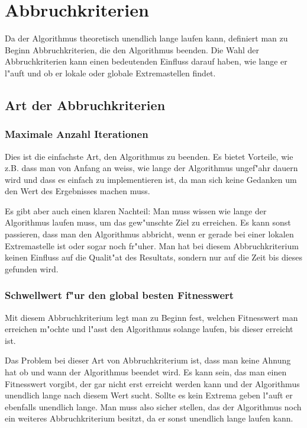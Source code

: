 \section{Abbruchkriterien}

Da der Algorithmus theoretisch unendlich lange laufen kann, definiert
man zu Beginn Abbruchkriterien, die den Algorithmus beenden.
Die Wahl der Abbruchkriterien kann einen bedeutenden Einfluss darauf
haben, wie lange er l"auft und ob er lokale oder globale Extremastellen
findet.

\subsection{Art der Abbruchkriterien}

\subsubsection{Maximale Anzahl Iterationen}
Dies ist die einfachste Art, den Algorithmus zu beenden. Es bietet
Vorteile, wie z.B. dass man von Anfang an weiss, wie lange der Algorithmus
ungef"ahr dauern wird und dass es einfach zu implementieren ist, da man
sich keine Gedanken um den Wert des Ergebnisses machen muss.

Es gibt aber auch einen klaren Nachteil: Man muss wissen wie lange der
Algorithmus laufen muss, um das gew"unschte Ziel zu erreichen. Es kann
sonst passieren, dass man den Algorithmus abbricht, wenn er gerade bei
einer lokalen Extremastelle ist oder sogar noch fr"uher. Man hat bei
diesem Abbruchkriterium keinen Einfluss auf die Qualit"at des Resultats,
sondern nur auf die Zeit bis dieses gefunden wird.

\subsubsection{Schwellwert f"ur den global besten Fitnesswert}
Mit diesem Abbruchkriterium legt man zu Beginn fest, welchen Fitnesswert
man erreichen m"ochte und l"asst den Algorithmus solange laufen, bis
dieser erreicht ist.

Das Problem bei dieser Art von Abbruchkriterium ist, dass man keine
Ahnung hat ob und wann der Algorithmus beendet wird. Es kann sein, das
man einen Fitnesswert vorgibt, der gar nicht erst erreicht werden kann
und der Algorithmus unendlich lange nach diesem Wert sucht. Sollte es
kein Extrema geben l"auft er ebenfalls unendlich lange. Man muss also
sicher stellen, das der Algorithmus noch ein weiteres Abbruchkriterium
besitzt, da er sonst unendlich lange laufen kann.

